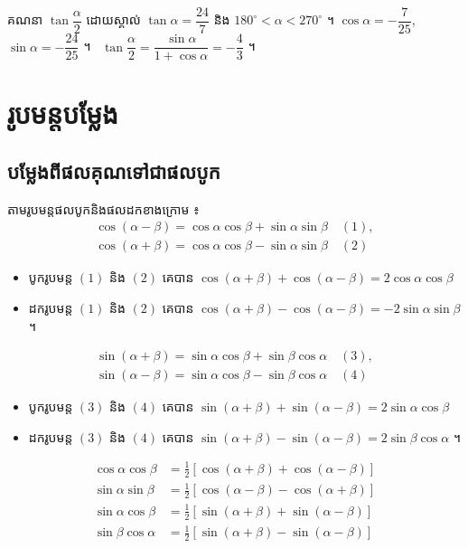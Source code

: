 \begin{pro}
គណនា $\tan\dfrac{\alpha}{2}$ ដោយស្គាល់ $\tan\alpha = \dfrac{24}{7}$ និង $180^\circ < \alpha < 270^\circ$ ។
\ans
$\cos\alpha = -\dfrac{7}{25}$, $\sin\alpha = -\dfrac{24}{25}$ ។ \ $\tan\dfrac{\alpha}{2} = \dfrac{\sin\alpha}{1 + \cos\alpha} = -\dfrac{4}{3}$ ។
\end{pro}

\section{រូបមន្តបម្លែង}

\subsection{បម្លែងពីផលគុណទៅជាផលបូក}

តាមរូបមន្តផលបូកនិងផលដកខាងក្រោម ៖
\[
\begin{gathered}
\cos(\alpha - \beta) = \cos\alpha\cos\beta + \sin\alpha\sin\beta \quad (1),\\
\cos(\alpha + \beta) = \cos\alpha\cos\beta - \sin\alpha\sin\beta \quad (2)
\end{gathered}
\]
\begin{itemize}
  \item បូករូបមន្ត $(1)$ និង $(2)$ គេបាន $\cos(\alpha + \beta) + \cos(\alpha - \beta) = 2\cos\alpha\cos\beta$
  \item ដករូបមន្ត $(1)$ និង $(2)$ គេបាន $\cos(\alpha + \beta) - \cos(\alpha - \beta) = -2\sin\alpha\sin\beta$ ។
\end{itemize}
\[
\begin{gathered}
\sin(\alpha + \beta) = \sin\alpha\cos\beta + \sin\beta\cos\alpha \quad (3),\\
\sin(\alpha - \beta) = \sin\alpha\cos\beta - \sin\beta\cos\alpha \quad (4)
\end{gathered}
\]
\begin{itemize}
  \item បូករូបមន្ត $(3)$ និង $(4)$ គេបាន $\sin(\alpha + \beta) + \sin(\alpha - \beta) = 2\sin\alpha\cos\beta$
  \item ដករូបមន្ត $(3)$ និង $(4)$ គេបាន $\sin(\alpha + \beta) - \sin(\alpha - \beta) = 2\sin\beta\cos\alpha$ ។
\end{itemize}
\begin{formulaBox}[ដូច្នេះ គេបានរូបមន្ត]
\[
\begin{aligned}
\cos\alpha\cos\beta &= \frac{1}{2}[\cos(\alpha + \beta) + \cos(\alpha - \beta)]\\
\sin\alpha\sin\beta &= \frac{1}{2}[\cos(\alpha - \beta) - \cos(\alpha + \beta)]\\
\sin\alpha\cos\beta &= \frac{1}{2}[\sin(\alpha + \beta) + \sin(\alpha - \beta)]\\
\sin\beta\cos\alpha &= \frac{1}{2}[\sin(\alpha + \beta) - \sin(\alpha - \beta)]
\end{aligned}
\]
\end{formulaBox}

